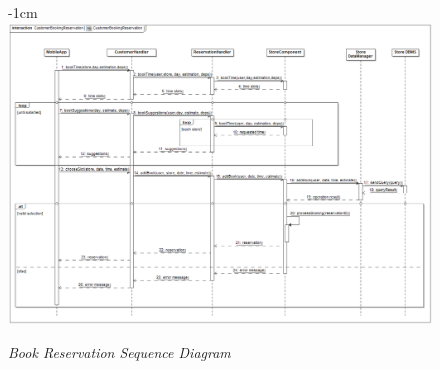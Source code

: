 \documentclass{article}
\begin{document}
	\begin{figure}[H]
		\begin{adjustwidth} {-1cm}{}
			\centering
			\includegraphics[scale=0.3]{Sequence Diagrams/sd__CustomerBookingReservation__CustomerBookingReservation.png}
		\end{adjustwidth}
		\caption{\emph{Book Reservation Sequence Diagram}}
	\end{figure}
\end{document}
